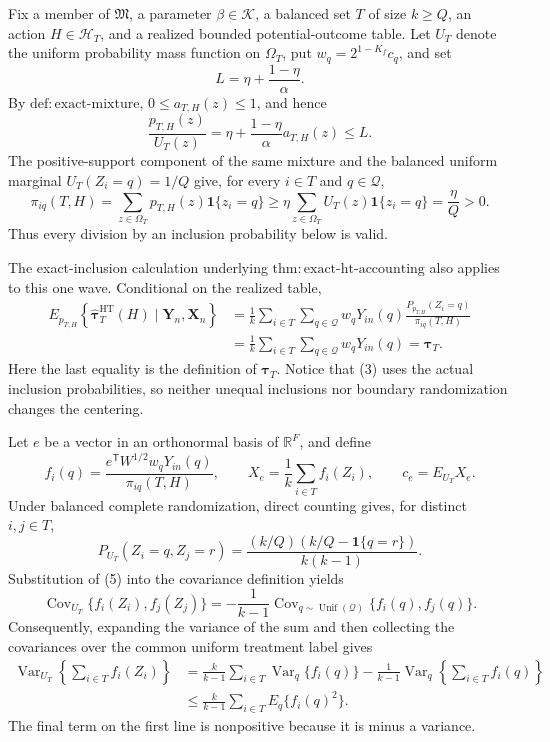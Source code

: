 Fix a member of \(\mathfrak M\), a parameter \(\beta\in\mathcal K\), a balanced set \(T\) of size \(k\geq Q\), an action \(H\in\mathcal H_T\), and a realized bounded potential-outcome table.  Let \(U_T\) denote the uniform probability mass function on \(\Omega_T\), put \(w_q=2^{1-K_f}c_q\), and set
\[
L=\eta+\frac{1-\eta}{\alpha}.
\]
By \(\mathrm{def{:}exact\text{-}mixture}\), \(0\leq a_{T,H}(z)\leq1\), and hence
\[
\frac{p_{T,H}(z)}{U_T(z)}
=\eta+\frac{1-\eta}{\alpha}a_{T,H}(z)
\leq L.
\tag{1}
\]
The positive-support component of the same mixture and the balanced uniform marginal \(U_T(Z_i=q)=1/Q\) give, for every \(i\in T\) and \(q\in\mathcal Q\),
\[
\pi_{iq}(T,H)
=\sum_{z\in\Omega_T}p_{T,H}(z)\mathbf 1\{z_i=q\}
\geq \eta\sum_{z\in\Omega_T}U_T(z)\mathbf 1\{z_i=q\}
=\frac{\eta}{Q}>0.
\tag{2}
\]
Thus every division by an inclusion probability below is valid.

The exact-inclusion calculation underlying \(\mathrm{thm{:}exact\text{-}ht\text{-}accounting}\) also applies to this one wave.  Conditional on the realized table,
\[
\begin{aligned}
E_{p_{T,H}}\!\left\{\widehat{\boldsymbol\tau}^{\mathrm{HT}}_T(H)\mid\mathbf Y_n,\mathbf X_n\right\}
&=\frac1k\sum_{i\in T}\sum_{q\in\mathcal Q}
w_qY_{in}(q)\frac{P_{p_{T,H}}(Z_i=q)}{\pi_{iq}(T,H)}\\
&=\frac1k\sum_{i\in T}\sum_{q\in\mathcal Q}w_qY_{in}(q)
=\boldsymbol\tau_T.
\end{aligned}
\tag{3}
\]
Here the last equality is the definition of \(\boldsymbol\tau_T\).  Notice that (3) uses the actual inclusion probabilities, so neither unequal inclusions nor boundary randomization changes the centering.

Let \(e\) be a vector in an orthonormal basis of \(\mathbb R^F\), and define
\[
f_i(q)=\frac{e^{\mathsf T}W^{1/2}w_qY_{in}(q)}{\pi_{iq}(T,H)},
\qquad
X_e=\frac1k\sum_{i\in T}f_i(Z_i),
\qquad
c_e=E_{U_T}X_e.
\tag{4}
\]
Under balanced complete randomization, direct counting gives, for distinct \(i,j\in T\),
\[
P_{U_T}(Z_i=q,Z_j=r)
=\frac{(k/Q)(k/Q-\mathbf 1\{q=r\})}{k(k-1)}.
\tag{5}
\]
Substitution of (5) into the covariance definition yields
\[
\operatorname{Cov}_{U_T}\{f_i(Z_i),f_j(Z_j)\}
=-\frac1{k-1}\operatorname{Cov}_{q\sim\operatorname{Unif}(\mathcal Q)}
\{f_i(q),f_j(q)\}.
\tag{6}
\]
Consequently, expanding the variance of the sum and then collecting the covariances over the common uniform treatment label gives
\[
\begin{aligned}
\operatorname{Var}_{U_T}\!\left\{\sum_{i\in T}f_i(Z_i)\right\}
&=\frac{k}{k-1}\sum_{i\in T}\operatorname{Var}_{q}\{f_i(q)\}
-\frac1{k-1}\operatorname{Var}_{q}\!\left\{\sum_{i\in T}f_i(q)\right\}\\
&\leq \frac{k}{k-1}\sum_{i\in T}E_q\{f_i(q)^2\}.
\end{aligned}
\tag{7}
\]
The final term on the first line is nonpositive because it is minus a variance.

